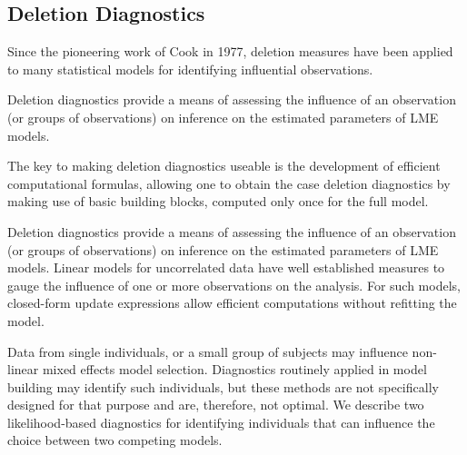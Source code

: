 \documentclass[12pt, a4paper]{report}
\theoremstyle{plain}
\theoremstyle{definition}
\theoremstyle{remark}
\begin{document}
	
	
	
	
	
	
	
	
	\newpage
	\subsection{Deletion Diagnostics}
	
	Since the pioneering work of Cook in 1977, deletion measures have been applied to many statistical models for identifying influential observations.
	
	Deletion diagnostics provide a means of assessing the influence of an observation (or groups of observations) on inference on the estimated parameters of LME models.
	
	
	
	
	The key to making deletion diagnostics useable is the development of efficient computational formulas, allowing one to obtain the  case deletion diagnostics by making use of basic building blocks, computed only once for the full model.
	
	Deletion diagnostics provide a means of assessing the influence of an observation (or groups of observations) on inference on the estimated parameters of LME models. Linear models for uncorrelated data have well established measures to gauge the influence of one or more observations on the analysis. For such models, closed-form update expressions allow efficient computations without refitting the model.
	
	Data from single individuals, or a small group of subjects may influence non-linear mixed effects model selection. Diagnostics routinely applied in model building may identify such individuals, but these methods are not specifically designed for that purpose and are, therefore, not optimal. We describe two likelihood-based diagnostics for identifying individuals that can influence the choice between two competing models.
	
\end{document}
